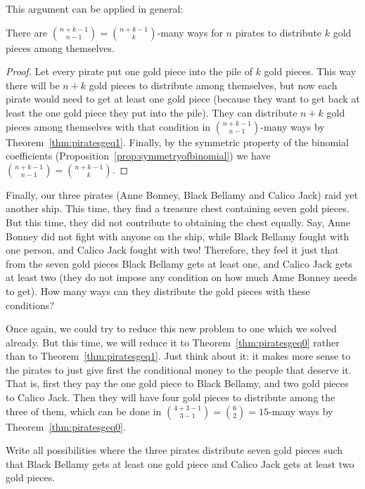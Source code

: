 This argument can be applied in general: 

\begin{theorem}\label{thm:piratesgeq0}
There are $\binom{n+k-1}{n-1} = \binom{n+k-1}{k}$-many ways for $n$ pirates to distribute $k$ gold pieces among themselves. 
\end{theorem}

\begin{proof}
Let every pirate put one gold piece into the pile of $k$ gold pieces. 
This way there will be $n+k$ gold pieces to distribute among themselves, 
but now each pirate would need to get at least one gold piece 
(because they want to get back at least the one gold piece they put into the pile). 
They can distribute $n+k$ gold pieces among themselves with that condition in $\binom{n+k-1}{n-1}$-many ways by Theorem~\ref{thm:piratesgeq1}. 
Finally, 
by the symmetric property of the binomial coefficients (Proposition~\ref{prop:symmetryofbinomial}) we have $\binom{n+k-1}{n-1} = \binom{n+k-1}{k}$. 
\end{proof}

Finally, our three pirates (Anne Bonney, Black Bellamy and Calico Jack) raid yet another ship. 
This time, they find a treasure chest containing seven gold pieces. 
But this time, they did not contribute to obtaining the chest equally. 
Say, Anne Bonney did not fight with anyone on the ship, 
while Black Bellamy fought with one person, 
and Calico Jack fought with two!
Therefore, they feel it just that from the seven gold pieces 
Black Bellamy gets at least one, and Calico Jack gets at least two
(they do not impose any condition on how much Anne Bonney needs to get). 
How many ways can they distribute the gold pieces with these conditions? 

Once again, we could try to reduce this new problem to one which we solved already. 
But this time, we will reduce it to Theorem~\ref{thm:piratesgeq0} rather than to Theorem~\ref{thm:piratesgeq1}. 
Just think about it: it makes more sense to the pirates to just give first the conditional money to the people that deserve it. 
That is, first they pay the one gold piece to Black Bellamy, 
and two gold pieces to Calico Jack. 
Then they will have four gold pieces to distribute among the three of them, 
which can be done in $\binom{4+3-1}{3-1} = \binom{6}{2} = 15$-many ways by Theorem~\ref{thm:piratesgeq0}. 

\begin{exercise}\label{ex:piratesgeq012}
Write all possibilities where the three pirates distribute seven gold pieces such that 
Black Bellamy gets at least one gold piece and Calico Jack gets at least two gold pieces. 
\end{exercise}

